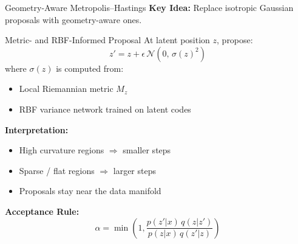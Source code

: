 \documentclass[aspectratio=169, 10pt]{beamer}
\begin{document}
\begin{frame}{Geometry-Aware Metropolis–Hastings}
  \textbf{Key Idea:} Replace isotropic Gaussian proposals with geometry-aware ones.

  \begin{block}{Metric- and RBF-Informed Proposal}
    At latent position $z$, propose:
    $$
    z' = z + \epsilon \, \mathcal{N}(0, \, \sigma(z)^2)
    $$
    where $\sigma(z)$ is computed from:
    \begin{itemize}
        \item Local Riemannian metric $M_z$
        \item RBF variance network trained on latent codes
    \end{itemize}
  \end{block}

  \textbf{Interpretation:}
  \begin{itemize}
      \item High curvature regions $\Rightarrow$ smaller steps
      \item Sparse / flat regions $\Rightarrow$ larger steps
      \item Proposals stay near the data manifold
  \end{itemize}

  \vspace{0.2cm}
  \textbf{Acceptance Rule:}
  \begin{equation*}
    \alpha = \min\left(1, 
    \frac{p(z'|x) \, q(z|z')}
         {p(z|x) \, q(z'|z)} \right)
  \end{equation*}
\end{frame}
\end{document}
